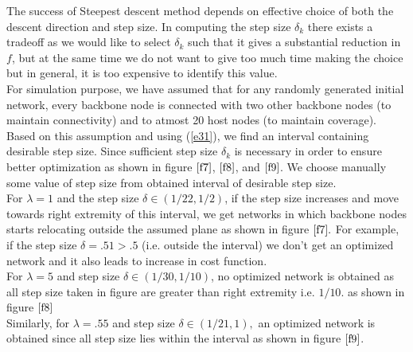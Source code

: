 \documentclass[11pt]{article}
\numberwithin{equation}{section}
\begin{document}
 The success of Steepest descent method depends on effective choice of both the descent direction and step size. In computing the step size $\delta_k$ there exists a tradeoff as we would like to select $\delta_k$ such that it gives a substantial reduction in $f$, but at the same time we do not want to give too much time making the choice but in general, it is too expensive to identify this value.\\

For simulation purpose, we have assumed that for any randomly generated initial network, every backbone node is connected with two other backbone nodes (to maintain connectivity) and to atmost 20 host nodes (to maintain coverage). Based on this assumption and using (\ref{e31}), we find an interval containing desirable step size. Since sufficient step size $\delta_k$ is necessary in order to ensure better optimization as shown in figure $\ref{f7}$, $\ref{f8}$, and $\ref{f9}$. We choose manually some value of step size from obtained interval of desirable step size.\\

For $\lambda =1$ and the step size  $\delta \in (1/22,1/2)$, if the step size increases and move towards right extremity of this interval, we get networks in which backbone nodes starts relocating outside the assumed plane as shown in figure $\ref{f7}.$ For example, if the step size $\delta =.51 > .5$ (i.e. outside the interval) we don't get an optimized network and it also leads to increase in cost function.\\

For $\lambda =5$ and step size $\delta \in (1/30,1/10)$, no optimized network is obtained as all step size taken in figure are greater than right extremity i.e. $1/10.$ as shown in figure $\ref{f8}$\\

Similarly, for $\lambda =.55$ and step size $\delta \in (1/21,1),$ an optimized network is obtained since all step size lies within the interval as shown in figure $\ref{f9}$.\\
\end{document}
